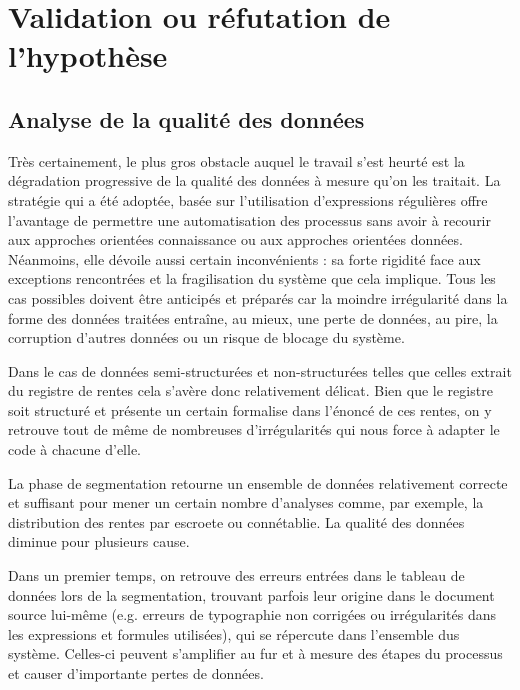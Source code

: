 \section{Validation ou réfutation de l'hypothèse}
\subsection{Analyse de la qualité des données}
Très certainement, le plus gros obstacle auquel le travail s'est heurté est la dégradation progressive de la qualité des données à mesure qu'on les traitait.
La stratégie qui a été adoptée, basée sur l'utilisation d'expressions régulières offre l'avantage de permettre une automatisation des processus sans avoir à recourir aux approches orientées connaissance ou aux approches orientées données. Néanmoins, elle dévoile aussi certain inconvénients : sa forte rigidité face aux exceptions rencontrées et la fragilisation du système que cela implique. Tous les cas possibles doivent être anticipés et préparés car la moindre irrégularité dans la forme des données traitées entraîne, au mieux, une perte de données, au pire, la corruption d'autres données ou un risque de blocage du système.

Dans le cas de données semi-structurées et non-structurées telles que celles extrait du registre de rentes cela s'avère donc relativement délicat. Bien que le registre soit structuré et présente un certain formalise dans l'énoncé de ces rentes, on y retrouve tout de même de nombreuses d'irrégularités qui nous force à adapter le code à chacune d'elle. 

La phase de segmentation retourne un ensemble de données relativement correcte et suffisant pour mener un certain nombre d'analyses comme, par exemple, la distribution des rentes par escroete ou connétablie. 
La qualité des données diminue pour plusieurs cause.

Dans un premier temps, on retrouve des erreurs entrées dans le tableau de données lors de la segmentation, trouvant parfois leur origine dans le document source lui-même (e.g. erreurs de typographie non corrigées ou irrégularités dans les expressions et formules utilisées), qui se répercute dans l'ensemble dus système. Celles-ci peuvent s'amplifier au fur et à mesure des étapes du processus et causer d'importante pertes de données. 






